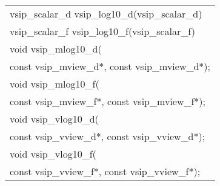 \\\cvsiplh
\afh
\\\hspace*{.04\textwidth} {
\ttfamily
\begin{tabular}[H]{l}
vsip\_scalar\_d vsip\_log10\_d(vsip\_scalar\_d)\\
vsip\_scalar\_f vsip\_log10\_f(vsip\_scalar\_f)\\
void vsip\_mlog10\_d(\\*\hspace{1cm}const vsip\_mview\_d*, const vsip\_mview\_d*);\\
void vsip\_mlog10\_f(\\*\hspace{1cm}const vsip\_mview\_f*, const vsip\_mview\_f*);\\
void vsip\_vlog10\_d(\\*\hspace{1cm}const vsip\_vview\_d*, const vsip\_vview\_d*);\\
void vsip\_vlog10\_f(\\*\hspace{1cm}const vsip\_vview\_f*, const vsip\_vview\_f*);\\
\end{tabular}
}
\\\pyjvsiph
{}
